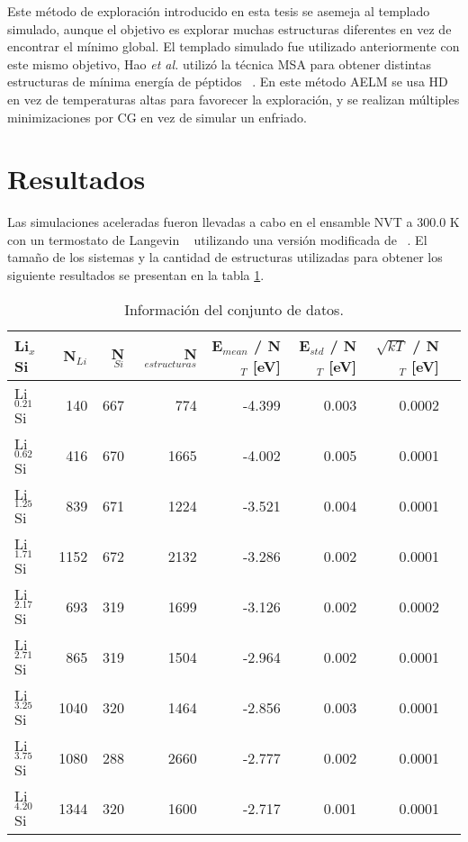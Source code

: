 Este método de exploración introducido en esta tesis se asemeja al templado
simulado, aunque el objetivo es explorar muchas estructuras diferentes en vez de 
encontrar el mínimo global. El templado simulado fue utilizado anteriormente
con este mismo objetivo, Hao \textit{et al.} utilizó la técnica MSA para obtener
distintas estructuras de mínima energía de péptidos ~\cite{hao2015}. En este 
método AELM se usa HD en vez de temperaturas altas para favorecer la exploración,
y se realizan múltiples minimizaciones por CG en vez de simular un enfriado. 


\section{Resultados}

Las simulaciones aceleradas fueron llevadas a cabo en el ensamble NVT a 300.0 K
con un termostato de Langevin ~\cite{schneider1978} utilizando una versión 
modificada de  ~\cite{gems}. El tamaño de los sistemas y la cantidad
de estructuras utilizadas para obtener los siguiente resultados se presentan
en la tabla \ref{t:siminfo}.
\begin{table}[h]
    \centering
    \begin{tabular}{|l|r|r|r|r|r|r|r|}
    \hline
    Li$_{x}$Si & N$_{Li}$ & N$_{Si}$ & N$_{estructuras}$ & E$_{mean}$ / N$_T$ [eV] & E$_{std}$ / N$_T$ [eV] & $\sqrt{kT}$ / N$_T$ [eV] \\
    \hline
    Li$_{0.21}$Si & 140 & 667 & 774 & -4.399 & 0.003 & 0.0002 \\
    Li$_{0.62}$Si & 416 & 670 & 1665 & -4.002 & 0.005 & 0.0001 \\
    Li$_{1.25}$Si & 839 & 671 & 1224 & -3.521 & 0.004 & 0.0001 \\
    Li$_{1.71}$Si & 1152 & 672 & 2132 & -3.286 & 0.002 & 0.0001 \\
    Li$_{2.17}$Si & 693 & 319 & 1699 & -3.126 & 0.002 & 0.0002 \\
    Li$_{2.71}$Si & 865 & 319 & 1504 & -2.964 & 0.002 & 0.0001 \\
    Li$_{3.25}$Si & 1040 & 320 & 1464 & -2.856 & 0.003 & 0.0001 \\
    Li$_{3.75}$Si & 1080 & 288 & 2660 & -2.777 & 0.002 & 0.0001 \\
    Li$_{4.20}$Si & 1344 & 320 & 1600 & -2.717 & 0.001 & 0.0001 \\
    \hline
    \end{tabular}
    \caption{Información del conjunto de datos.}
    \label{t:siminfo}
\end{table}

